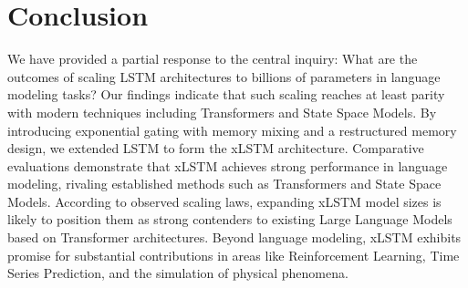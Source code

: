 \section{Conclusion}
We have provided a partial response to the central inquiry: What are the outcomes of scaling LSTM architectures to billions of parameters in language modeling tasks? Our findings indicate that such scaling reaches at least parity with modern techniques including Transformers and State Space Models. By introducing exponential gating with memory mixing and a restructured memory design, we extended LSTM to form the xLSTM architecture. Comparative evaluations demonstrate that xLSTM achieves strong performance in language modeling, rivaling established methods such as Transformers and State Space Models. According to observed scaling laws, expanding xLSTM model sizes is likely to position them as strong contenders to existing Large Language Models based on Transformer architectures. Beyond language modeling, xLSTM exhibits promise for substantial contributions in areas like Reinforcement Learning, Time Series Prediction, and the simulation of physical phenomena.

